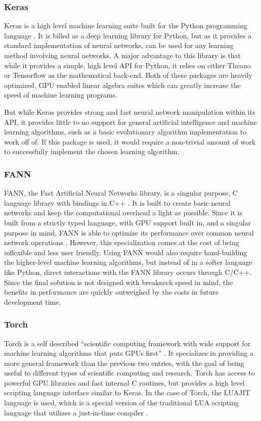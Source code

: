 \subsubsection{Keras}
Keras is a high level machine learning suite built for the Python programming language \cite{keras}.
It is billed as a deep learning library for Python, but as it provides a standard implementation of neural networks, can be used for any learning method involving neural networks.
A major advantage to this library is that while it provides a simple, high level API for Python, it relies on either Theano or Tensorflow as the mathematical back-end.
Both of these packages are heavily optimized, GPU enabled linear algebra suites which can greatly increase the speed of machine learning programs.

But while Keras provides strong and fast neural network manipulation within its API, it provides little to no support for general artificial intelligence and machine learning algorithms, such as a basic evolutionary algorithm implementation to work off of.
If this package is used, it would require a non-trivial amount of work to successfully implement the chosen learning algorithm.

\subsubsection{FANN}
FANN, the Fast Artificial Neural Networks library, is a singular purpose, C language library with bindings in C++ \cite{fann}.
It is built to create basic neural networks and keep the computational overhead a light as possible.
Since it is built from a strictly typed language, with GPU support built in, and a singular purpose in mind, FANN is able to optimize its performance over common neural network operations \cite{fann}.
However, this specialization comes at the cost of being inflexible and less user friendly.
Using FANN would also require hand-building the higher-level machine learning algorithms, but instead of in a softer language like Python, direct interactions with the FANN library occurs through C/C++.
Since the final solution is not designed with breakneck speed in mind, the benefits in performance are quickly outweighed by the costs in future development time.

\subsubsection{Torch}
Torch is a self described ``scientific computing framework with wide support for machine learning algorithms that puts GPUs first'' \cite{torch}.
It specializes in providing a more general framework than the previous two entries, with the goal of being useful to different types of scientific computing and research.
Torch has access to powerful GPU libraries and fast internal C routines, but provides a high level scripting language interface similar to Keras.
In the case of Torch, the LUAJIT language is used, which is a special version of the traditional LUA scripting language that utilizes a just-in-time compiler \cite{torch}.


